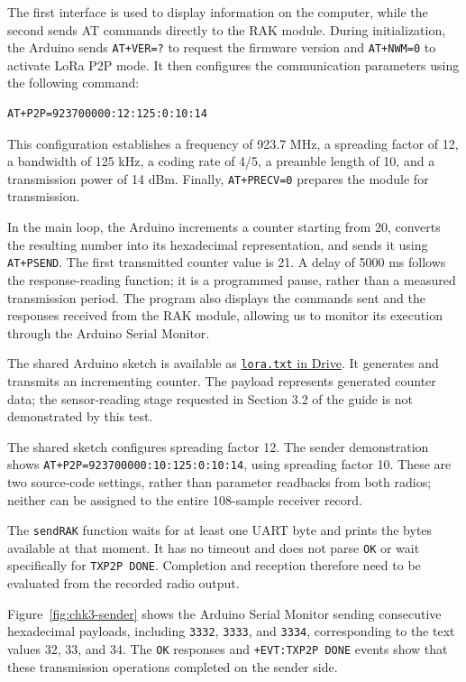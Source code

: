 The first interface is used to display information on the computer, while the second sends AT commands directly to the RAK module.
During initialization, the Arduino sends \texttt{AT+VER=?} to request the firmware version and \texttt{AT+NWM=0} to activate LoRa P2P mode.
It then configures the communication parameters using the following command:

\begin{lstlisting}[basicstyle=\ttfamily\scriptsize,breaklines=true,columns=fullflexible]
AT+P2P=923700000:12:125:0:10:14
\end{lstlisting}

This configuration establishes a frequency of 923.7 MHz, a spreading factor of 12, a bandwidth of 125 kHz, a coding rate of 4/5, a preamble length of 10, and a transmission power of 14 dBm.
Finally, \texttt{AT+PRECV=0} prepares the module for transmission.

In the main loop, the Arduino increments a counter starting from 20, converts the resulting number into its hexadecimal representation, and sends it using \texttt{AT+PSEND}.
The first transmitted counter value is 21. A delay of 5000 ms follows the response-reading function; it is a programmed pause, rather than a measured transmission period.
The program also displays the commands sent and the responses received from the RAK module, allowing us to monitor its execution through the Arduino Serial Monitor.

The shared Arduino sketch is available as \href{https://drive.google.com/file/d/1SrnPct0enrU3doz0R0MApW0z8LCoYyoH/view}{\texttt{lora.txt} in Drive}. It generates and transmits an incrementing counter. The payload represents generated counter data; the sensor-reading stage requested in Section 3.2 of the guide is not demonstrated by this test.


The shared sketch configures spreading factor 12. The sender demonstration shows \texttt{AT+P2P=923700000:10:125:0:10:14}, using spreading factor 10. These are two source-code settings, rather than parameter readbacks from both radios; neither can be assigned to the entire 108-sample receiver record.

The \texttt{sendRAK} function waits for at least one UART byte and prints the bytes available at that moment. It has no timeout and does not parse \texttt{OK} or wait specifically for \texttt{TXP2P DONE}. Completion and reception therefore need to be evaluated from the recorded radio output.


Figure~\ref{fig:chk3-sender} shows the Arduino Serial Monitor sending consecutive hexadecimal payloads, including \texttt{3332}, \texttt{3333}, and \texttt{3334}, corresponding to the text values 32, 33, and 34.
The \texttt{OK} responses and \texttt{+EVT:TXP2P DONE} events show that these transmission operations completed on the sender side.


